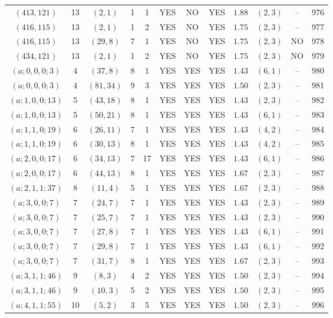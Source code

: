 \begin{longtable}{|c|c|c|c|c|c|c|c|c|c|c|c|}
$(413,121)$ & 13 & $(2,1)$ & 1 & 1 & YES & NO & YES & $1.88$ & $(2,3)$ & -- & 976\\
$(416,115)$ & 13 & $(2,1)$ & 1 & 2 & YES & NO & YES & $1.75$ & $(2,3)$ & -- & 977\\
$(416,115)$ & 13 & $(29,8)$ & 7 & 1 & YES & NO & YES & $1.75$ & $(2,3)$ & NO & 978\\
$(434,121)$ & 13 & $(2,1)$ & 1 & 2 & YES & NO & YES & $1.75$ & $(2,3)$ & NO & 979\\
$(a;0,0,0;3)$ & 4 & $(37,8)$ & 8 & 1 & YES & YES & YES & $1.43$ & $(6,1)$ & -- & 980\\
$(a;0,0,0;3)$ & 4 & $(81,34)$ & 9 & 3 & YES & YES & YES & $1.50$ & $(2,3)$ & -- & 981\\
$(a;1,0,0;13)$ & 5 & $(43,18)$ & 8 & 1 & YES & YES & YES & $1.43$ & $(2,3)$ & -- & 982\\
$(a;1,0,0;13)$ & 5 & $(50,21)$ & 8 & 1 & YES & YES & YES & $1.43$ & $(6,1)$ & -- & 983\\
$(a;1,1,0;19)$ & 6 & $(26,11)$ & 7 & 1 & YES & YES & YES & $1.43$ & $(4,2)$ & -- & 984\\
$(a;1,1,0;19)$ & 6 & $(30,13)$ & 8 & 1 & YES & YES & YES & $1.43$ & $(4,2)$ & -- & 985\\
$(a;2,0,0;17)$ & 6 & $(34,13)$ & 7 & 17 & YES & YES & YES & $1.43$ & $(6,1)$ & -- & 986\\
$(a;2,0,0;17)$ & 6 & $(44,13)$ & 8 & 1 & YES & YES & YES & $1.67$ & $(2,3)$ & -- & 987\\
$(a;2,1,1;37)$ & 8 & $(11,4)$ & 5 & 1 & YES & YES & YES & $1.67$ & $(2,3)$ & -- & 988\\
$(a;3,0,0;7)$ & 7 & $(24,7)$ & 7 & 1 & YES & YES & YES & $1.43$ & $(2,3)$ & -- & 989\\
$(a;3,0,0;7)$ & 7 & $(25,7)$ & 7 & 1 & YES & YES & YES & $1.43$ & $(2,3)$ & -- & 990\\
$(a;3,0,0;7)$ & 7 & $(27,8)$ & 7 & 1 & YES & YES & YES & $1.43$ & $(6,1)$ & -- & 991\\
$(a;3,0,0;7)$ & 7 & $(29,8)$ & 7 & 1 & YES & YES & YES & $1.43$ & $(6,1)$ & -- & 992\\
$(a;3,0,0;7)$ & 7 & $(31,7)$ & 8 & 1 & YES & YES & YES & $1.67$ & $(2,3)$ & -- & 993\\
$(a;3,1,1;46)$ & 9 & $(8,3)$ & 4 & 2 & YES & YES & YES & $1.50$ & $(2,3)$ & -- & 994\\
$(a;3,1,1;46)$ & 9 & $(10,3)$ & 5 & 2 & YES & YES & YES & $1.50$ & $(2,3)$ & -- & 995\\
$(a;4,1,1;55)$ & 10 & $(5,2)$ & 3 & 5 & YES & YES & YES & $1.50$ & $(2,3)$ & -- & 996\\

\end{longtable}
